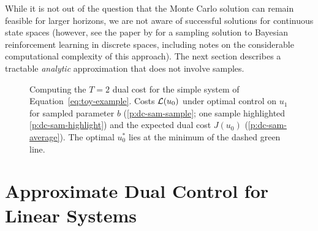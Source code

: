 While it is not out of the question that the Monte Carlo solution can remain
feasible for larger horizons, we are not aware of successful solutions for
continuous state spaces (however, see the paper by
\textcite{Poupart.Vlassis.ea:2006:Analytic} for a sampling solution to Bayesian
reinforcement learning in discrete spaces, including notes on the considerable
computational complexity of this approach). The next section describes a
tractable \emph{analytic} approximation that does not involve samples.

\begin{figure}
  \setlength{}
  \setlength\figureheight{0.618\figurewidth}
  \footnotesize
  \caption[Computing the $T=2$ dual cost for the simple
    system.]{Computing the $T=2$ dual cost for the simple
    system of Equation~\eqref{eq:toy-example}. Costs $\mathcal{L}(u_0)$ under
    optimal control on $u_1$ for sampled parameter $b$ (\ref*{p:dc-sam-sample};
    one sample highlighted \ref*{p:dc-sam-highlight}) and the expected dual cost
    $J(u_0)$ (\ref*{p:dc-sam-average}). The optimal $u_0 ^*$
    lies at the minimum of the dashed green line.}
  \label{fig:sampling_uncertain_b}
\end{figure}

\section{Approximate Dual Control for Linear Systems}
\label{sec:appr-dual-contr}

